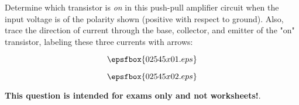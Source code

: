 

Determine which transistor is {\it on} in this push-pull amplifier circuit when the input voltage is of the polarity shown (positive with respect to ground).  Also, trace the direction of current through the base, collector, and emitter of the "on" transistor, labeling these three currents with arrows:

$$\epsfbox{02545x01.eps}$$







$$\epsfbox{02545x02.eps}$$







{\bf This question is intended for exams only and not worksheets!}.




